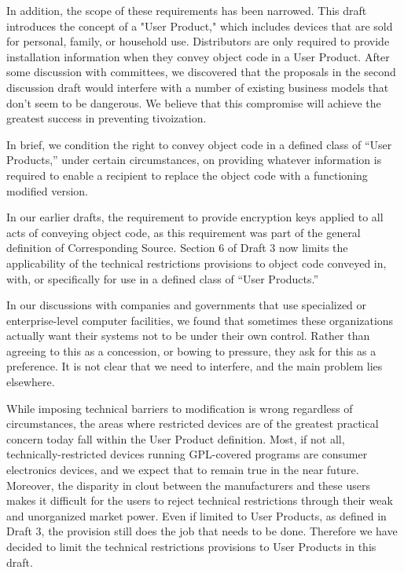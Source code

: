 In addition, the scope of these requirements has been narrowed.  This draft
introduces the concept of a "User Product," which includes devices that are
sold for personal, family, or household use.  Distributors are only
required to provide installation information when they convey object code
in a User Product.  After some discussion with committees, we discovered
that the proposals in the second discussion draft would interfere with a
number of existing business models that don't seem to be dangerous.  We
believe that this compromise will achieve the greatest success in
preventing tivoization.

In brief, we condition the right to convey object code in a defined class of
``User Products,'' under certain circumstances, on providing whatever
information is required to enable a recipient to replace the object code with
a functioning modified version.


In our earlier drafts, the requirement to provide encryption keys
applied to all acts of conveying object code, as this requirement was
part of the general definition of Corresponding Source. Section 6 of
Draft 3 now limits the applicability of the technical restrictions
provisions to object code conveyed in, with, or specifically for use in
a defined class of ``User Products.''

In our discussions with companies and governments that use specialized
or enterprise-level computer facilities, we found that sometimes these
organizations actually want their systems not to be under their own
control. Rather than agreeing to this as a concession, or bowing to
pressure, they ask for this as a preference. It is not clear that we
need to interfere, and the main problem lies elsewhere. 

While imposing technical barriers to modification is wrong regardless of
circumstances, the areas where restricted devices are of the greatest
practical concern today fall within the User Product definition. Most,
if not all, technically-restricted devices running GPL-covered programs
are consumer electronics devices, and we expect that to remain true in
the near future. Moreover, the disparity in clout between the
manufacturers and these users makes it difficult for the users to reject
technical restrictions through their weak and unorganized market
power. Even if limited to User Products, as defined in Draft 3, the
provision still does the job that needs to be done. Therefore we have
decided to limit the technical restrictions provisions to User Products
in this draft.

